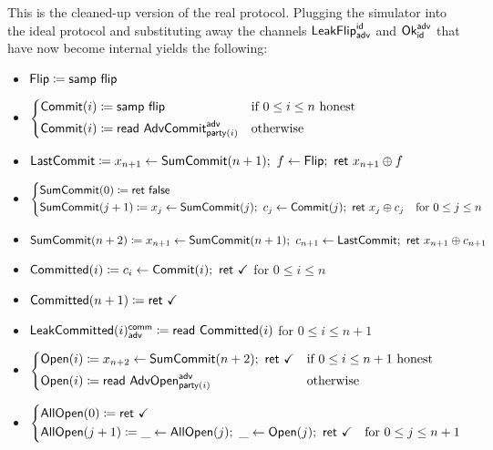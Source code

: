 \noindent This is the cleaned-up version of the real protocol. Plugging the simulator into the ideal protocol and substituting away the channels $\mathsf{LeakFlip}^{\mathsf{id}}_{\mathsf{adv}}$ and $\mathsf{Ok}^{\mathsf{adv}}_{\mathsf{id}}$ that have now become internal yields the following:

\begin{itemize}
\item $\mathsf{Flip} \coloneqq \mathsf{samp} \ \mathsf{flip}$
\item {\color{blue} $\begin{cases*} \Commit(i) \coloneqq \samp{\flip} & \text{if $0 \leq i \leq n$ honest} \\ \Commit(i) \coloneqq \read{\AdvCommit^\adv_{\party(i)}} & \text{otherwise} \end{cases*}$}
\item {\color{blue} $\mathsf{LastCommit} \coloneqq x_{n+1} \leftarrow \mathsf{SumCommit}(n+1); \ f \leftarrow \mathsf{Flip}; \ \mathsf{ret} \ x_{n+1} \oplus f$}
\item {\color{blue} $\begin{cases*} \SumCommit(0) \coloneqq \ret{\false} & \\ \SumCommit(j+1) \coloneqq x_j \leftarrow \SumCommit(j); \ c_j \leftarrow \Commit(j); \ \ret{x_j \oplus c_j} & \text{for $0 \leq j \leq n$} \end{cases*}$}
\item {\color{blue} $\SumCommit(n+2) \coloneqq x_{n+1} \leftarrow \SumCommit(n+1); \ c_{n+1} \leftarrow \LastCommit; \ \ret{x_{n+1} \oplus c_{n+1}}$}
\item {\color{magenta} $\mathsf{Committed}(i) \coloneqq c_i \leftarrow \mathsf{Commit}(i); \ \mathsf{ret} \ \checkmark$ for $0 \leq i \leq n$}
\item {\color{magenta} $\mathsf{Committed}(n+1) \coloneqq \mathsf{ret} \ \checkmark$}
\item {\color{magenta} $\mathsf{LeakCommitted}(i)^{\mathsf{comm}}_{\mathsf{adv}} \coloneqq \mathsf{read} \ \mathsf{Committed}(i)$ for $0 \leq i \leq n+1$}
\item {\color{teal} $\begin{cases*} \Open(i) \coloneqq x_{n+2} \leftarrow \SumCommit(n+2); \ \ret{\checkmark} & \text{if $0 \leq i \leq n+1$ honest} \\ \Open(i) \coloneqq \read{\AdvOpen^\adv_{\party(i)}} & \text{otherwise} \end{cases*}$}
\item {\color{teal} $\begin{cases*} \AllOpen(0) \coloneqq \ret{\checkmark} & \\ \AllOpen(j+1) \coloneqq \_ \leftarrow \AllOpen(j); \ \_ \leftarrow \Open(j); \ \ret{\checkmark} & \text{for $0 \leq j \leq n+1$} \end{cases*}$}

\end{itemize}
